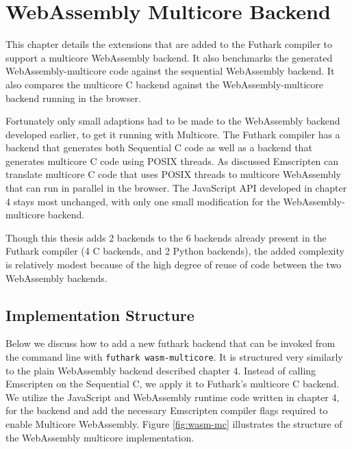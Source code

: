 \documentclass[11pt]{book}
\begin{document}



\newpage
\chapter{WebAssembly Multicore Backend}

This chapter details the extensions that are added to the Futhark compiler to support a multicore WebAssembly backend. It also benchmarks the generated WebAssembly-multicore code against the sequential WebAssembly backend. It also compares the multicore C backend against the WebAssembly-multicore backend running in the browser.

Fortunately only small adaptions had to be made to the WebAssembly backend developed earlier, to get it running with Multicore. The Futhark compiler has a backend that generates both Sequential C code as well as a backend that generates multicore C code using POSIX threads. As discussed Emscripten can translate multicore C code that uses POSIX threads to multicore WebAssembly that can run in parallel in the browser. The JavaScript API developed in chapter 4 stays most unchanged, with only one small modification for the WebAssembly-multicore backend. 

Though this thesis adds 2 backends to the 6 backends already present in the Futhark compiler (4 C backends, and 2 Python backends), the added complexity is relatively modest because of the high degree of reuse of code between the two WebAssembly backends. 


\section{Implementation Structure}

Below we discuss how to add a new futhark backend that can be invoked from the command line with \texttt{futhark wasm-multicore}. It is structured very similarly to the plain WebAssembly backend described chapter 4. Instead of calling Emscripten on the Sequential C, we apply it to Futhark's multicore C backend. We utilize the JavaScript and WebAssembly runtime code written in chapter 4, for the backend and add the necessary Emscripten compiler flags required to enable Multicore WebAssembly. Figure \ref{fig:wasm-mc} illustrates the structure of the WebAssembly multicore implementation.
\end{document}
